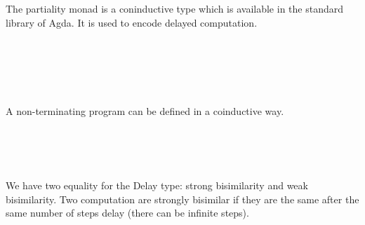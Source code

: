 The partiality monad is a coninductive type which is available in the
standard library of Agda. It is used to encode delayed computation.

\begin{code}
\\
\>  \AgdaSymbol{(} \AgdaSymbol{:} \AgdaSymbol{)} \AgdaSymbol{:}  \<%
\\
\>[0]\<[2]%
\>[2] \AgdaSymbol{:}    \<%
\\
\>[0]\<[2]%
\>[2] \AgdaSymbol{:}  \AgdaSymbol{(} \AgdaSymbol{)}   \<%
\\
\end{code}

A non-terminating program can be defined in a coinductive way.

\begin{code}
\\
\> \AgdaSymbol{:} \AgdaSymbol{\{} \AgdaSymbol{:} \AgdaSymbol{\}}   \<%
\\
\> \AgdaSymbol{=}  \AgdaSymbol{(} \AgdaSymbol{)}\<%
\\
\end{code}

We have two equality for the Delay type: strong bisimilarity and weak
bisimilarity. 
Two computation are strongly bisimilar if they are the
same after the same number of steps delay (there can be infinite
steps).

